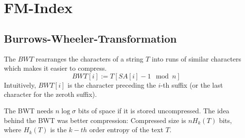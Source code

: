 \section{FM-Index}

\subsection{Burrows-Wheeler-Transformation}

\begin{Definition}
  The  $BWT$ rearranges the characters of a string $T$ into runs of similar characters which makes it easier to compress.
  \begin{equation}
    BWT[i] := T[SA[i] - 1 \mod n]
  \end{equation}
  Intuitively, $BWT[i]$ is the character preceding the $i$-th suffix (or the last character for the zeroth suffix).
\end{Definition}

The BWT needs $n\log\sigma$ bits of space if it is stored uncompressed. The idea behind the BWT was better compression: Compressed size is $nH_k(T)$ bits, where $H_k(T)$ is the $k-th$ order entropy of the text $T$.

